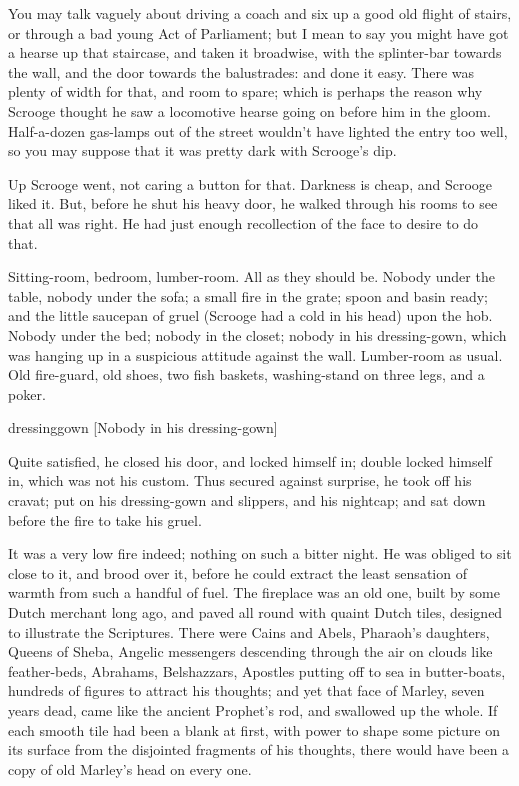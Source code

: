 You may talk vaguely about driving a coach and six up a good old flight of
stairs, or through a bad young Act of Parliament; but I mean to say you might
have got a hearse up that staircase, and taken it broad\-wise, with the
splinter-bar towards the wall, and the door towards the balustrades: and done it
easy. There was plenty of width for that, and room to spare; which is perhaps
the reason why Scrooge thought he saw a locomotive hearse going on before him in
the gloom. Half-a-dozen gas-lamps out of the street wouldn't have lighted the
entry too well, so you may suppose that it was pretty dark with Scrooge's dip.

Up Scrooge went, not caring a button for that. Darkness is cheap, and Scrooge
liked it. But, before he shut his heavy door, he walked through his rooms to see
that all was right. He had just enough recollection of the face to desire to do
that.

Sitting-room, bedroom, lumber-room. All as they should be. Nobody under the
table, nobody under the sofa; a small fire in the grate; spoon and basin ready;
and the little saucepan of gruel (Scrooge had a cold in his head) upon the hob.
Nobody under the bed; nobody in the closet; nobody in his dressing-gown, which
was hanging up in a suspicious attitude against the wall. Lumber-room as usual.
Old fire-guard, old shoes, two fish baskets, washing-stand on three legs, and a
poker.

  \begin{colorbigpic}
    [\basicscale] 
    {dressinggown}
    [Nobody in his dressing-gown]
  \end{colorbigpic}


Quite satisfied, he closed his door, and locked himself in; double locked
himself in, which was not his custom. Thus secured against surprise, he took off
his cravat; put on his dressing-gown and slippers, and his nightcap; and sat
down before the fire to take his gruel.

It was a very low fire indeed; nothing on such a bitter night. He was obliged to
sit close to it, and brood over it, before he could extract the least sensation
of warmth from such a handful of fuel. The fireplace was an old one, built by
some Dutch merchant long ago, and paved all round with quaint Dutch tiles,
designed to illustrate the Scriptures. There were Cains and Abels, Pharaoh's
daughters, Queens of Sheba, Angelic messengers descending through the air on
clouds like feather-beds, Abrahams, Belshazzars, Apostles putting off to sea in
butter-boats, hundreds of figures to attract his thoughts; and yet that face of
Marley, seven years dead, came like the ancient Prophet's rod, and swallowed up
the whole. If each smooth tile had been a blank at first, with power to shape
some picture on its surface from the disjointed fragments of his thoughts, there
would have been a copy of old Marley's head on every one.

